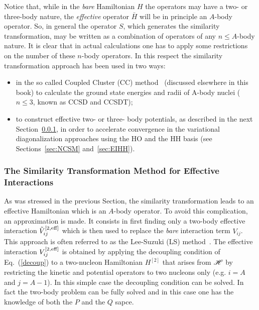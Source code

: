 Notice that, while in the {\it bare} Hamiltonian $H$ the operators may have  a two- or three-body nature, the  
{\it effective} operator ${\bar H}$ will be in principle an $A$-body operator. So, in general the operator $S$, 
which generates the similarity transformation, may be written as a combination of operators of any $n\leq A$-body nature. 
It is clear that in actual calculations one has to apply some restrictions on the number of these $n$-body
operators. In this respect the similarity transformation approach has been used in two ways: 
\begin{itemize}
 \item  in the so called Coupled Cluster (CC) method~\cite{Zab:1978,HJ:2004}  (discussed elsewhere in this book) 
 to calculate the ground state energies and radii of A-body nuclei ($n\leq 3$, known as CCSD and CCSDT);
 \item to construct effective two- or three- body potentials, as described in the next Section~\ref{sec:LS},
 in order to accelerate convergence in the variational diagonalization approaches using the  HO  
and the HH basis (see Sections~\ref{sec:NCSM} and~\ref{sec:EIHH}).
\end{itemize}



\subsubsection{The Similarity Transformation Method for Effective Interactions}
\label{sec:LS}

As was stressed in the previous Section, the similarity transformation leads to  an  effective Hamiltonian 
which is an $A$-body operator. To avoid this complication, an approximation is made. It consists 
in first finding only a two-body effective interaction $\tilde V_{ij}^{\rm [2,eff]}$
which is then used to replace  the {\it bare} interaction term $ V_{ij}$. This approach is often referred to
as the Lee-Suzuki (LS) method~\cite{SuL80}. The effective interaction $V_{ij}^{\rm [2,eff]}$
is obtained  by applying the decoupling condition of Eq.~(\ref{decoup}) to a two-nucleon
Hamiltonian $H^{[2]}$  that arises from ${\cal H}$ by restricting  the kinetic and potential operators
to two nucleons only (e.g. $i=A$ and $j=A-1$). In this simple case the decoupling condition can be solved.
In fact the two-body problem can be fully solved and in this case one has the knowledge of both the $P$ and the $Q$ sapce.

